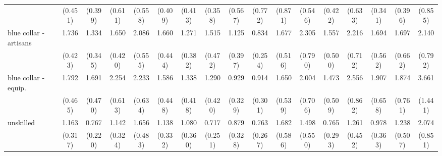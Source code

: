 {\begin{tabular}{l*{16}{c}}
                    &     (0.451)         &     (0.399)         &     (0.611)         &     (0.558)         &     (0.409)         &     (0.413)         &     (0.358)         &     (0.567)         &     (0.772)         &     (0.871)         &     (0.546)         &     (0.422)         &     (0.633)         &     (0.341)         &     (0.396)         &     (0.855)         \\
[1em]
blue collar - artisans&       1.736\sym{*}  &       1.334         &       1.650\sym{*}  &       2.086\sym{**} &       1.660         &       1.271         &       1.515         &       1.125         &       0.834         &       1.677         &       2.305\sym{*}  &       1.557         &       2.216\sym{*}  &       1.694         &       1.697         &       2.140\sym{*}  \\
                    &     (0.423)         &     (0.345)         &     (0.420)         &     (0.555)         &     (0.444)         &     (0.382)         &     (0.472)         &     (0.397)         &     (0.254)         &     (0.516)         &     (0.790)         &     (0.500)         &     (0.712)         &     (0.562)         &     (0.662)         &     (0.792)         \\
[1em]
blue collar - equip.&       1.792\sym{*}  &       1.691         &       2.254\sym{**} &       2.233\sym{**} &       1.586         &       1.338         &       1.290         &       0.929         &       0.914         &       1.650         &       2.004\sym{*}  &       1.473         &       2.556\sym{**} &       1.907         &       1.874         &       3.661\sym{***}\\
                    &     (0.465)         &     (0.470)         &     (0.613)         &     (0.634)         &     (0.448)         &     (0.418)         &     (0.420)         &     (0.329)         &     (0.301)         &     (0.539)         &     (0.706)         &     (0.509)         &     (0.862)         &     (0.658)         &     (0.761)         &     (1.441)         \\
[1em]
unskilled           &       1.163         &       0.767         &       1.142         &       1.656         &       1.138         &       1.080         &       0.717         &       0.879         &       0.763         &       1.682         &       1.498         &       0.765         &       1.261         &       0.978         &       1.238         &       2.074         \\
                    &     (0.317)         &     (0.220)         &     (0.324)         &     (0.483)         &     (0.332)         &     (0.360)         &     (0.251)         &     (0.328)         &     (0.267)         &     (0.586)         &     (0.550)         &     (0.293)         &     (0.452)         &     (0.363)         &     (0.507)         &     (0.851)         \\

\end{tabular}}

